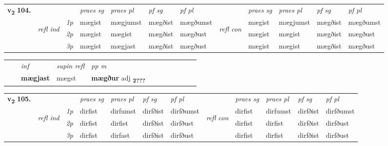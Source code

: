 \begin{tabular}{llllllllllll} \toprule
\multirow{4}{*}{{{\textbf{v{\textsubscript{2}}} \Large{\textbf{104.}}}}}  & &   &  \textit{praes sg}  & \textit{praes pl}  &\textit{pf sg} & \textit{pf pl} &  &  \textit{praes sg}  & \textit{praes pl}  & \textit{pf sg} & \textit{pf pl } \\*
	\cmidrule{4-7} \cmidrule{9-12}
 &\multirow{3}{*}{\begin{turn}{90}\textit{refl ind}\end{turn}} & {\textit{1p}} & mægist & mægjumst    & mægðist & mægðumst & \multirow{3}{*}{\begin{turn}{90}\textit{refl con}\end{turn}}  &mægist & mægjumst & mægðist & mægðumst\\*
 &&  {\textit{2p}} &  mægist  & mægist   & mægðist & mægðust & &mægist & mægist & mægðist & mægðust \\*
& &  {\textit{3p}} & mægist & mægjast   & mægðist & mægðust & & mægist & mægist& mægðist & mægðust  \\*
\cmidrule{4-7} \cmidrule{9-12}
\end{tabular}


\begin{tabular}{llllllllllll}
 & & \textit{inf}       & \textit{supin refl} & \textit{pp m}     \\*
  & & \textbf{mægjast}        & mægst & \textbf{mægður} adj \textbf{\textsubscript{2???}} \\*
\cmidrule{1-12}
\end{tabular}



\begin{tabular}{llllllllllll} \toprule
\multirow{4}{*}{{{\textbf{v{\textsubscript{2}}} \Large{\textbf{105.}}}}}  & &   &  \textit{praes sg}  & \textit{praes pl}  &\textit{pf sg} & \textit{pf pl} &  &  \textit{praes sg}  & \textit{praes pl}  & \textit{pf sg} & \textit{pf pl } \\*
	\cmidrule{4-7} \cmidrule{9-12}
 &\multirow{3}{*}{\begin{turn}{90}\textit{refl ind}\end{turn}} & {\textit{1p}} & dirfist & dirfumst    & dirfðist & dirfðumst & \multirow{3}{*}{\begin{turn}{90}\textit{refl con}\end{turn}}  &dirfist & dirfumst & dirfðist & dirfðumst\\*
 &&  {\textit{2p}} &  dirfist  & dirfist   & dirfðist & dirfðust & &dirfist & dirfist & dirfðist & dirfðust \\*
& &  {\textit{3p}} & dirfist & dirfast   & dirfðist & dirfðust & & dirfist & dirfist& dirfðist & dirfðust  \\*
\cmidrule{4-7} \cmidrule{9-12}
\end{tabular}



